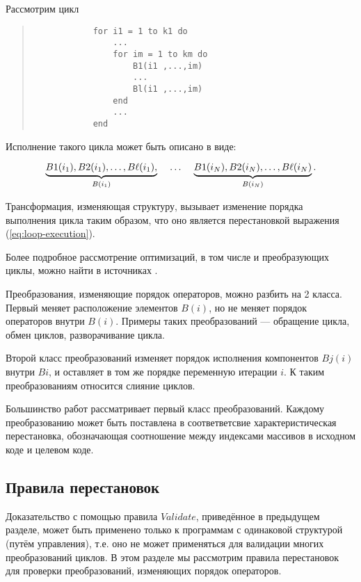 Рассмотрим цикл

\begin{center}
	\begin{quote}
		\begin{verbatim}
			for i1 = 1 to k1 do
    			...
				for im = 1 to km do
					B1(i1 ,...,im)
					...
					Bl(i1 ,...,im)
				end
				...
			end
		\end{verbatim}
	\end{quote}
\end{center}

Исполнение такого цикла может быть описано в виде:

\begin{equation}\label{eq:loop-execution}
	\underbrace{B1(i_{1}), B2(i_{1}), \ldots, B\ell(i_{1}),}_{B(i_{1})} 
	\hspace{4mm} \ldots \hspace{4mm} 
	\underbrace{B1(i_{N}), B2(i_{N}), \ldots, B\ell(i_{N})}_{B(i_{N})}.
\end{equation}

Трансформация, изменяющая структуру, вызывает изменение порядка выполнения цикла таким образом, что оно является перестановкой выражения (\ref{eq:loop-execution}).

Более подробное рассмотрение оптимизаций, в том числе и преобразующих циклы, можно найти в источниках \cite{ZuckPFGH02,Bacon}.

Преобразования, изменяющие порядок операторов, можно разбить на 2 класса. Первый меняет расположение элементов $B(i)$, но не меняет порядок операторов внутри $B(i)$. Примеры таких преобразований --- обращение цикла, обмен циклов, разворачивание цикла.

Второй класс преобразований изменяет порядок исполнения компонентов $Bj(i)$ внутри $B{i}$, и оставляет в том же порядке переменную итерации $i$. К таким преобразованиям относится слияние циклов.

Большинство работ рассматривает первый класс преобразований. Каждому преобразованию может быть поставлена в соответветсвие характеристическая перестановка, обозначающая соотношение между индексами массивов в исходном коде и целевом коде.

\subsection{Правила перестановок}

Доказательство с помощью правила $Validate$, приведённое в предыдущем разделе, может быть применено только к программам с одинаковой структурой (путём управления), т.е. оно не может применяться для валидации многих преобразований циклов. В этом разделе мы рассмотрим правила перестановок для проверки преобразований, изменяющих порядок операторов.


